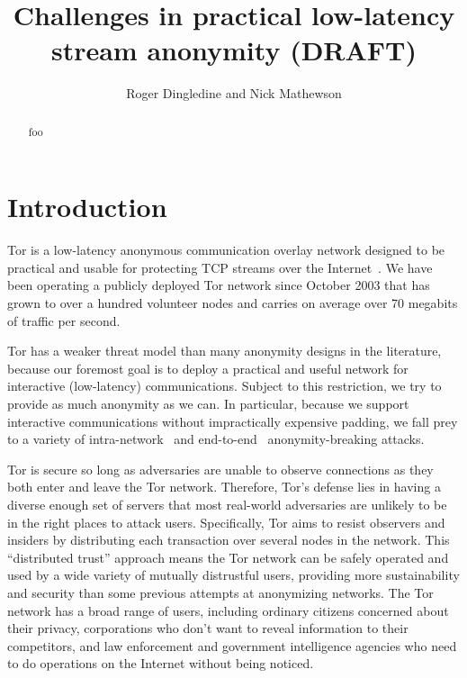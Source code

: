 \documentclass{llncs}
\begin{document}
\title{Challenges in practical low-latency stream anonymity (DRAFT)}

\author{Roger Dingledine and Nick Mathewson}

\maketitle
\pagestyle{empty}

\begin{abstract}
foo
\end{abstract}

\section{Introduction}

Tor is a low-latency anonymous communication overlay network designed
to be practical and usable for protecting TCP streams over the
Internet~\cite{tor-design}. We have been operating a publicly deployed
Tor network since October 2003 that has grown to over a hundred volunteer
nodes and carries on average over 70 megabits of traffic per second.

Tor has a weaker threat model than many anonymity designs in the
literature, because our foremost goal is to deploy a
practical and useful network for interactive (low-latency) communications.
Subject to this restriction, we try to
provide as much anonymity as we can. In particular, because we
support interactive communications without impractically expensive padding,
we fall prey to a variety
of intra-network~\cite{attack-tor-oak05,flow-correlation04,bar} and
end-to-end~\cite{danezis-pet2004,SS03} anonymity-breaking attacks.

Tor is secure so long as adversaries are unable to
observe connections as they both enter and leave the Tor network.
Therefore, Tor's defense lies in having a diverse enough set of servers
that most real-world
adversaries are unlikely to be in the right places to attack users.
Specifically,
Tor aims to resist observers and insiders by distributing each transaction
over several nodes in the network.  This ``distributed trust'' approach
means the Tor network can be safely operated and used by a wide variety
of mutually distrustful users, providing more sustainability and security
than some previous attempts at anonymizing networks.
The Tor network has a broad range of users, including ordinary citizens
concerned about their privacy, corporations
who don't want to reveal information to their competitors, and law
enforcement and government intelligence agencies who need
to do operations on the Internet without being noticed.
\end{document}
